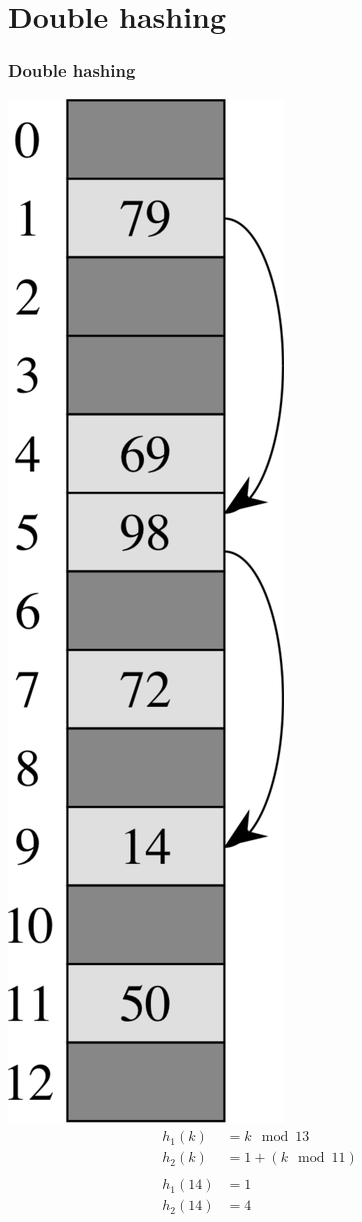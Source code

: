 \documentclass{beamer}
\newcommand{\sect}[1]{
\section{#1}
\begin{frame}[fragile]\frametitle{#1}
}
\begin{document}
\sect{Double hashing}
\begin{multicols}{2}
\includegraphics[height=0.75\textheight]{Fig-11-5.pdf}
\columnbreak
\begin{align*}
  h_1(k) &= k \mod 13\\
  h_2(k) &= 1 + (k \mod 11)\\\\
  h_1(14) &= 1\\
  h_2(14) &= 4
\end{align*}

\end{multicols}
\end{frame}
\end{document}
